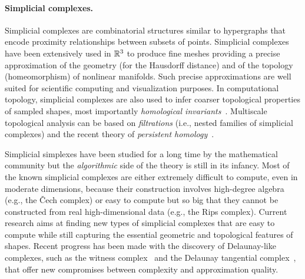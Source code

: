 \paragraph{Simplicial complexes.}  
Simplicial complexes are combinatorial structures similar to hypergraphs that encode proximity relationships between subsets of points.
Simplicial complexes have been extensively used in $\mathbb R ^3$ to produce fine meshes  providing a precise approximation of the geometry  (for the Hausdorff distance) and of the topology  (homeomorphism) of nonlinear manifolds.  Such precise approximations are
 well suited for scientific computing and visualization purposes.  In computational topology, simplicial complexes are also used to infer coarser topological properties of sampled shapes, most importantly {\em homological invariants}~\cite{kmm-ch-2003}. Multiscale topological analysis can be based on {\em filtrations} (i.e., nested families of simplicial complexes) and the recent theory of {\em persistent homology}~\cite{hh-ct-2010,az-tfc-2009}. 
 
Simplicial simplexes have been studied for a long time by the mathematical community but the {\em algorithmic} side of the theory is still in its infancy. Most of the known simplicial complexes are either extremely difficult to compute, even in moderate dimensions, because their construction involves high-degree algebra (e.g., the  \v{C}ech complex) or easy to compute but so big that they cannot be constructed from real high-dimensional data (e.g., the Rips complex). Current research aims at finding new types of simplicial complexes that are easy to compute while still capturing the essential geometric and topological features of shapes. Recent progress has been made with the discovery of Delaunay-like complexes, such as the witness complex~\cite{cds-tewc-2004} and the Delaunay tangential complex~\cite{geometrica-7142i}, that offer new compromises between complexity and approximation quality.

